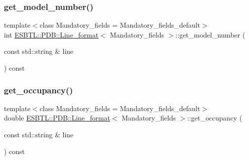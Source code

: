 \subsubsection{\texorpdfstring{get\+\_\+model\+\_\+number()}{get\_model\_number()}}
{\footnotesize\ttfamily template$<$class Mandatory\+\_\+fields  = Mandatory\+\_\+fields\+\_\+default$>$ \\
int \hyperlink{classESBTL_1_1PDB_1_1Line__format}{E\+S\+B\+T\+L\+::\+P\+D\+B\+::\+Line\+\_\+format}$<$ Mandatory\+\_\+fields $>$\+::get\+\_\+model\+\_\+number (\begin{DoxyParamCaption}\item[{const std\+::string \&}]{line }\end{DoxyParamCaption}) const\hspace{0.3cm}{\ttfamily [inline]}}

\mbox{\label{classESBTL_1_1PDB_1_1Line__format_a7c2498989dd637f008a1719adb9b44b9}} 
\subsubsection{\texorpdfstring{get\+\_\+occupancy()}{get\_occupancy()}}
{\footnotesize\ttfamily template$<$class Mandatory\+\_\+fields  = Mandatory\+\_\+fields\+\_\+default$>$ \\
double \hyperlink{classESBTL_1_1PDB_1_1Line__format}{E\+S\+B\+T\+L\+::\+P\+D\+B\+::\+Line\+\_\+format}$<$ Mandatory\+\_\+fields $>$\+::get\+\_\+occupancy (\begin{DoxyParamCaption}\item[{const std\+::string \&}]{line }\end{DoxyParamCaption}) const\hspace{0.3cm}{\ttfamily [inline]}}

\mbox{\label{classESBTL_1_1PDB_1_1Line__format_a3c79f8cc61a87820457d557ae2e6c62c}} 
